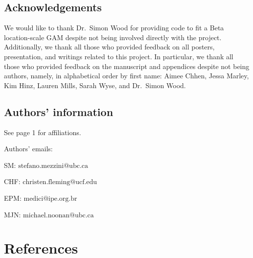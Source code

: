 \documentclass[
  12pt,
]{article}
\begin{document}
\subsection{Acknowledgements}\label{acknowledgements}

\noindent We would like to thank Dr.~Simon Wood for providing code to fit a Beta location-scale GAM despite not being involved directly with the project. Additionally, we thank all those who provided feedback on all posters, presentation, and writings related to this project. In particular, we thank all those who provided feedback on the manuscript and appendices despite not being authors, namely, in alphabetical order by first name: Aimee Chhen, Jessa Marley, Kim Hinz, Lauren Mills, Sarah Wyse, and Dr.~Simon Wood.

\subsection{Authors' information}\label{authors-information}

\noindent See page 1 for affiliations.

\noindent Authors' emails:

\noindent SM: \(\text{stefano.mezzini@ubc.ca}\)

\noindent CHF: \(\text{christen.fleming@ucf.edu}\)

\noindent EPM: \(\text{medici@ipe.org.br}\)

\noindent MJN: \(\text{michael.noonan@ubc.ca}\)

\clearpage

\newpage

\section{References}\label{references}

\end{document}
